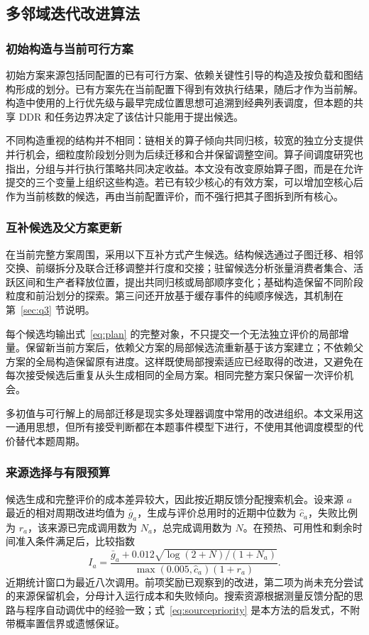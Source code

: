 \subsection{多邻域迭代改进算法}
\subsubsection{初始构造与当前可行方案}
初始方案来源包括同配置的已有可行方案、依赖关键性引导的构造及按负载和图结构形成的划分。已有方案先在当前配置下得到有效执行结果，随后才作为当前解。构造中使用的上行优先级与最早完成位置思想可追溯到经典列表调度\cite{A01}，但本题的共享 DDR 和任务边界决定了该估计只能用于提出候选。

不同构造重视的结构并不相同：链相关的算子倾向共同归核，较宽的独立分支提供并行机会，细粒度阶段划分则为后续迁移和合并保留调整空间。算子间调度研究也指出，分组与并行执行策略共同决定收益\cite{A08}。本文没有改变原始算子图，而是在允许提交的三个变量上组织这些构造。若已有较少核心的有效方案，可以增加空核心后作为当前核数的候选，再由当前配置评价，而不强行把其子图拆到所有核心。

\subsubsection{互补候选及父方案更新}
在当前完整方案周围，采用以下互补方式产生候选。结构候选通过子图迁移、相邻交换、前缀拆分及联合迁移调整并行度和交接；驻留候选分析张量消费者集合、活跃区间和生产者释放位置，提出共同归核或局部顺序变化；基础构造保留不同阶段粒度和前沿划分的探索。第三问还开放基于缓存事件的纯顺序候选，其机制在第~\ref{sec:q3} 节说明。

每个候选均输出式~\eqref{eq:plan} 的完整对象，不只提交一个无法独立评价的局部增量。保留新当前方案后，依赖父方案的局部候选流重新基于该方案建立；不依赖父方案的全局构造保留原有进度。这样既使局部搜索适应已经取得的改进，又避免在每次接受候选后重复从头生成相同的全局方案。相同完整方案只保留一次评价机会。

多初值与可行解上的局部迁移是现实多处理器调度中常用的改进组织\cite{A42}。本文采用这一通用思想，但所有接受判断都在本题事件模型下进行，不使用其他调度模型的代价替代本题周期。

\subsubsection{来源选择与有限预算}
候选生成和完整评价的成本差异较大，因此按近期反馈分配搜索机会。设来源 $a$ 最近的相对周期改进均值为 $\bar g_a$，生成与评价总用时的近期中位数为 $\widehat c_a$，失败比例为 $r_a$，该来源已完成调用数为 $N_a$，总完成调用数为 $N$。在预热、可用性和剩余时间准入条件满足后，比较指数
\begin{equation}
 I_a=\frac{\bar g_a+0.012\sqrt{\log(2+N)/(1+N_a)}}{
 \max(0.005,\widehat c_a)(1+r_a)}.
 \label{eq:sourcepriority}
\end{equation}
近期统计窗口为最近八次调用。前项奖励已观察到的改进，第二项为尚未充分尝试的来源保留机会，分母计入运行成本和失败倾向。搜索资源根据测量反馈分配的思路与程序自动调优中的经验一致\cite{A12}；式~\eqref{eq:sourcepriority} 是本方法的启发式，不附带概率置信界或遗憾保证。

